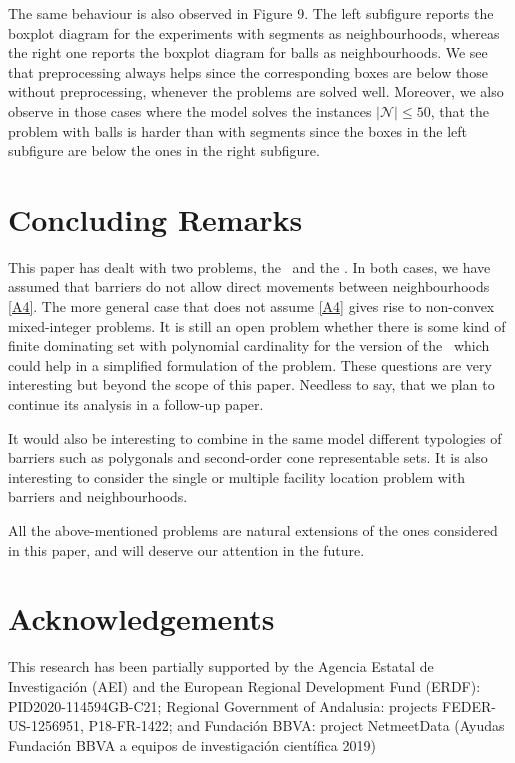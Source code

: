 \documentclass[a4paper,  review, authoryear, 1p.]{elsarticle}
\newcommand{\SPPN}{{\sf{H-SPPN}\xspace }}
\newcommand{\TSPN}{{\sf{H-TSPN}\xspace }}
\newcommand{\TSPVN}{{\sf{H-TSPVN}\xspace }}
\begin{document}
	The same behaviour is also observed in Figure 9. The left subfigure reports the boxplot diagram for the experiments with segments as neighbourhoods, whereas the right one reports the boxplot diagram for balls as neighbourhoods. We see that preprocessing always helps since the corresponding boxes are below those without preprocessing, whenever the problems are solved well. Moreover,  we also observe in those cases where the model solves the instances  $|\mathcal{N}|\le 50$, that the problem with balls is harder than with segments since the boxes in the left subfigure are below the ones in the right subfigure.
	
	
	
	
	
	
	
	
	\section{Concluding Remarks}
	
	This paper has dealt with two problems, the \SPPN \ and the \TSPN. In both cases, we have assumed that barriers do not allow direct movements between neighbourhoods \ref{A4}. The more general case that does not assume \ref{A4} gives rise to non-convex mixed-integer problems. It is still an open problem whether there is some kind of finite dominating set with polynomial cardinality for the version of the \TSPVN \ which could help in a simplified formulation of the problem. These questions are very interesting but beyond the scope of this paper. Needless to say, that we plan to continue its analysis in a follow-up paper.
	
	
	It would also be interesting to combine in the same model different typologies of barriers such as polygonals and second-order cone representable sets. It is also interesting to consider the single or multiple facility location problem with barriers and neighbourhoods. 
	
	All the above-mentioned problems are natural extensions of the ones considered in this paper, and  will deserve our attention in the future.
	
	\section*{Acknowledgements}
	This research has been partially supported by the Agencia Estatal de Investigación (AEI) and the European Regional Development Fund (ERDF): PID2020-114594GB-C21; Regional Government of Andalusia: projects FEDER-US-1256951, P18-FR-1422;  and Fundación BBVA: project NetmeetData (Ayudas
	Fundación BBVA a equipos de investigación científica 2019)
	
	
	
	
	
\end{document}

